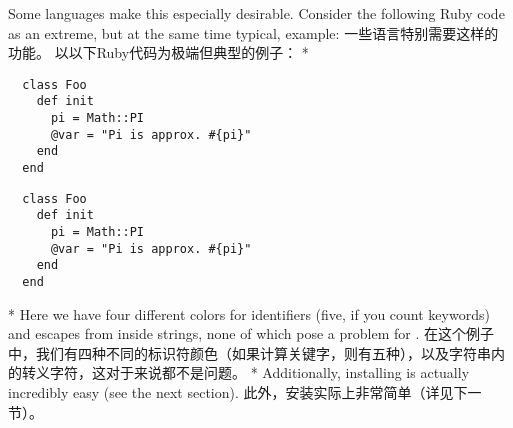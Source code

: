 \begin{paracol}{2}
Some languages make this especially desirable.
Consider the following Ruby code as an extreme, but at the same time typical, example:
\switchcolumn
一些语言特别需要这样的功能。
以以下Ruby代码为极端但典型的例子：
\switchcolumn[0]*%
\begin{verbatim}
  class Foo
    def init
      pi = Math::PI
      @var = "Pi is approx. #{pi}"
    end
  end
\end{verbatim}
\switchcolumn
\begin{verbatim}
  class Foo
    def init
      pi = Math::PI
      @var = "Pi is approx. #{pi}"
    end
  end
\end{verbatim}
\switchcolumn[0]*%
Here we have four different colors for identifiers (five, if you count keywords) and escapes from
inside strings, none of which pose a problem for .
\switchcolumn
在这个例子中，我们有四种不同的标识符颜色（如果计算关键字，则有五种），以及字符串内的转义字符，这对于来说都不是问题。
\switchcolumn[0]*%
Additionally, installing  is actually incredibly easy (see the next section).
\switchcolumn
此外，安装实际上非常简单（详见下一节）。
\end{paracol}